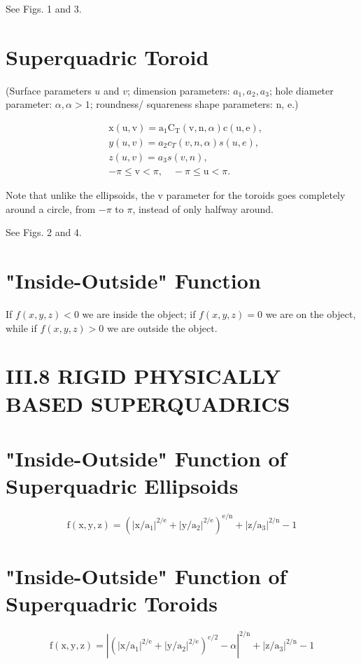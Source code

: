 See Figs. 1 and 3.

\section{Superquadric Toroid}
(Surface parameters $u$ and $v$; dimension parameters: $a_{1}, a_{2}, a_{3}$; hole diameter parameter: $\alpha, \alpha>1$; roundness/ squareness shape parameters: n, e.)

$$
\begin{aligned}
& \mathrm{x}(\mathrm{u}, \mathrm{v})=\mathrm{a}_{1} \mathrm{C}_{\mathrm{T}}(\mathrm{v}, \mathrm{n}, \alpha) \mathrm{c}(\mathrm{u}, \mathrm{e}), \\
& y(u, v)=a_{2} c_{T}(v, n, \alpha) s(u, e), \\
& z(u, v)=a_{3} s(v, n), \\
& -\pi \leq \mathrm{v}<\pi, \quad-\pi \leq \mathrm{u}<\pi .
\end{aligned}
$$

Note that unlike the ellipsoids, the $\mathrm{v}$ parameter for the toroids goes completely around a circle, from $-\pi$ to $\pi$, instead of only halfway around.

See Figs. 2 and 4.

\section{"Inside-Outside" Function}
If $f(x, y, z)<0$ we are inside the object; if $f(x, y, z)=0$ we are on the object, while if $f(x, y, z)>0$ we are outside the object.

\section{III.8 RIGID PHYSICALLY BASED SUPERQUADRICS}
\section{"Inside-Outside" Function of Superquadric Ellipsoids}
$$
\mathrm{f}(\mathrm{x}, \mathrm{y}, \mathrm{z})=\left(\left|\mathrm{x} / \mathrm{a}_{1}\right|^{2 / \mathrm{e}}+\left|\mathrm{y} / \mathrm{a}_{2}\right|^{2 / \mathrm{e}}\right)^{\mathrm{e} / \mathrm{n}}+\left|\mathrm{z} / \mathrm{a}_{3}\right|^{2 / \mathrm{n}}-1
$$

\section{"Inside-Outside" Function of Superquadric Toroids}
$$
\mathrm{f}(\mathrm{x}, \mathrm{y}, \mathrm{z})=\left|\left(\left|\mathrm{x} / \mathrm{a}_{1}\right|^{2 / \mathrm{e}}+\left|\mathrm{y} / \mathrm{a}_{2}\right|^{2 / \mathrm{e}}\right)^{e / 2}-\alpha\right|^{2 / \mathrm{n}}+\left|\mathrm{z} / \mathrm{a}_{3}\right|^{2 / \mathrm{n}}-1
$$

